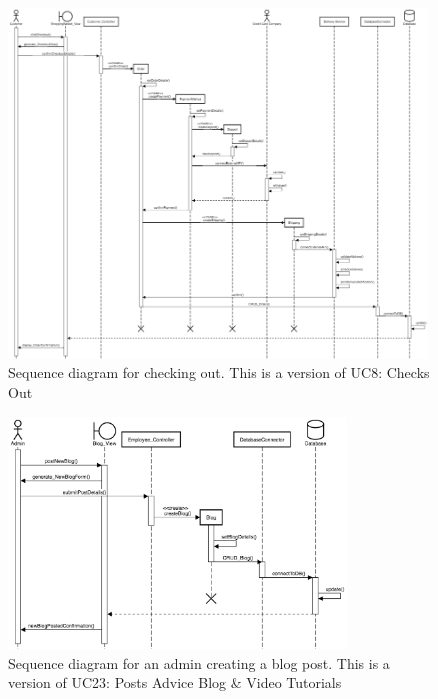 \documentclass[fontsize=11pt]{extarticle}
\numberwithin{figure}{section} %
\numberwithin{table}{section}%
\begin{document}
\begin{figure}[H]
      \centering
      \includegraphics[trim = 0 0 0 0, clip, width=0.99\textwidth]{TempImg/check_out_SD.png}
      \caption{Sequence diagram for checking out. This is a version of UC8: Checks Out}
\end{figure}

\begin{figure}[H]
      \centering
      \includegraphics[trim = 0 0 0 0, clip, width=0.8\textwidth]{TempImg/make_blog_post_SD.png}
      \caption{Sequence diagram for an admin creating a blog post. This is a version of UC23: Posts Advice Blog & Video Tutorials}
\end{figure}
\end{document}
